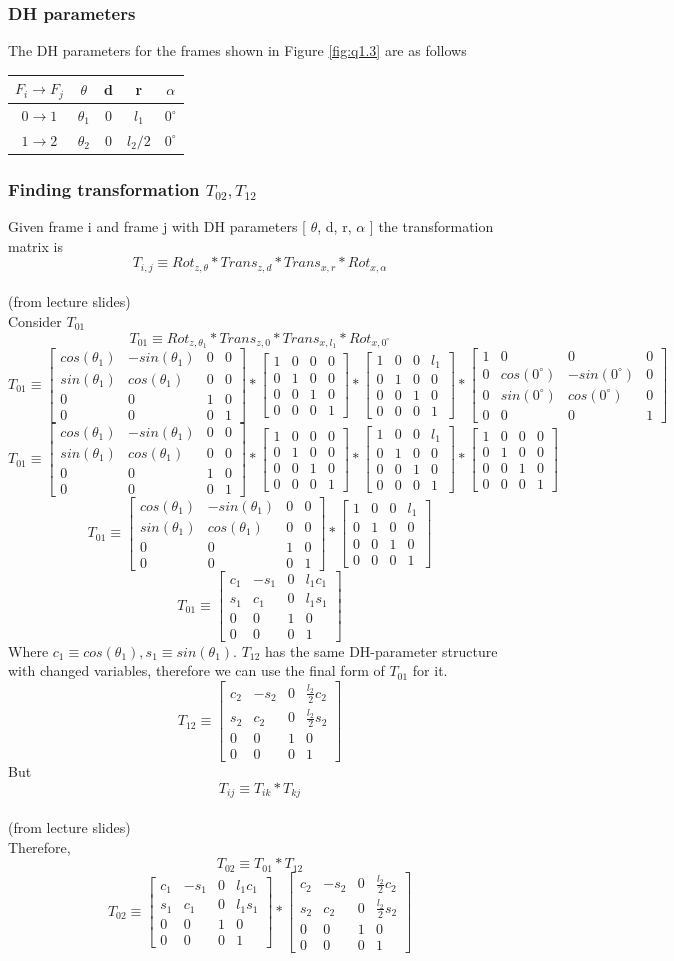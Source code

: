 \documentclass[12pt]{article}
\newcommand{\fromlectures}{{\\ \color{blue} \hspace*{\fill}(from lecture slides)} \\}
\newcommand{\rx}[1]{\begin{bmatrix} 1 & 0 & 0 & 0 \\ 0 & cos(#1) & -sin(#1) & 0 \\ 0 & sin(#1) & cos(#1) & 0 \\ 0 & 0 & 0 & 1 \end{bmatrix}}
\newcommand{\rz}[1]{\begin{bmatrix} cos(#1) & -sin(#1) & 0 & 0 \\ sin(#1) & cos(#1) & 0 & 0 \\ 0 & 0 & 1 & 0 \\ 0 & 0 & 0 & 1 \end{bmatrix}}
\newcommand{\iden}{\begin{bmatrix} 1 & 0 & 0 & 0 \\ 0 & 1 & 0 & 0 \\ 0 & 0 & 1 & 0 \\ 0 & 0 & 0 & 1 \end{bmatrix}}
\newcommand{\trans}[3]{\begin{bmatrix} 1 & 0 & 0 & #1 \\ 0 & 1 & 0 & #2 \\ 0 & 0 & 1 & #3 \\ 0 & 0 & 0 & 1 \end{bmatrix}}
\begin{document}
\subsubsection*{DH parameters}
The DH parameters for the frames shown in Figure \ref{fig:q1.3} are as follows
\begin{center}
\begin{tabular}{ c | c c c c }
 \hline
 $F_i \to F_j$ & $\theta$ & d & r & $\alpha$ \\
 \hline
 $0 \to 1$ & $\theta_1$ & 0 & $l_1$ & $0^{\circ}$ \\
 $1 \to 2$ & $\theta_2$ & 0 & $l_2 / 2$ & $0^{\circ}$ \\
 \hline
\end{tabular}
\end{center}

\subsubsection*{Finding transformation $T_{02}, T_{12}$}
Given frame i and frame j with DH parameters [ $\theta$, d, r, $\alpha$ ] the transformation matrix is
\[
  T_{i,j} \equiv Rot_{z,\theta} * Trans_{z, d} * Trans_{x, r} * Rot_{x, \alpha}
\]
\fromlectures
Consider $T_{01}$
\[
  T_{01} \equiv Rot_{z,\theta_1} * Trans_{z, 0} * Trans_{x, l_1} * Rot_{x, 0^{\circ}}
\]
\[
  T_{01} \equiv \rz{\theta_1} * \trans{0}{0}{0} * \trans{l_1}{0}{0} * \rx{0^{\circ}}
\]
\[
  T_{01} \equiv \rz{\theta_1} * \iden * \trans{l_1}{0}{0} * \iden
\]
\[
  T_{01} \equiv \rz{\theta_1} * \trans{l_1}{0}{0}
\]
\[
  T_{01} \equiv
  \begin{bmatrix} c_1 & -s_1 & 0 & l_1c_1 \\ s_1 & c_1 & 0 & l_1s_1 \\ 0 & 0 & 1 & 0 \\ 0 & 0 & 0 & 1 \end{bmatrix}
\]
Where $c_1 \equiv cos(\theta_1), s_1 \equiv sin(\theta_1)$.
$T_{12}$ has the same DH-parameter structure with changed variables, therefore we can use the final form of $T_{01}$ for it.
\[
  T_{12} \equiv
  \begin{bmatrix} c_2 & -s_2 & 0 & \frac{l_2}{2}c_2 \\ s_2 & c_2 & 0 & \frac{l_2}{2}s_2 \\ 0 & 0 & 1 & 0 \\ 0 & 0 & 0 & 1 \end{bmatrix}
\]
But
\[
  T_{ij} \equiv T_{ik} * T_{kj}
\]
\fromlectures
Therefore,
\[
  T_{02} \equiv T_{01} * T_{12}
\]
\[
  T_{02} \equiv
  \begin{bmatrix} c_1 & -s_1 & 0 & l_1c_1 \\ s_1 & c_1 & 0 & l_1s_1 \\ 0 & 0 & 1 & 0 \\ 0 & 0 & 0 & 1 \end{bmatrix}
  *
  \begin{bmatrix} c_2 & -s_2 & 0 & \frac{l_2}{2}c_2 \\ s_2 & c_2 & 0 & \frac{l_2}{2}s_2 \\ 0 & 0 & 1 & 0 \\ 0 & 0 & 0 & 1 \end{bmatrix}
\]
\end{document}
